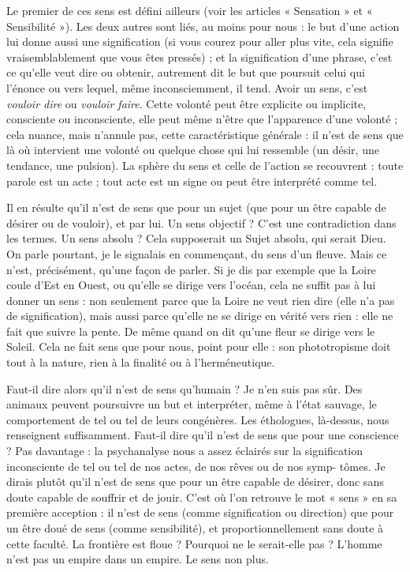 Le premier de ces sens est défini ailleurs (voir les articles « Sensation » et
« Sensibilité »). Les deux autres sont liés, au moins pour nous : le but d’une
action lui donne aussi une signification (si vous courez pour aller plus vite, cela
signifie vraisemblablement que vous êtes pressés) ; et la signification d’une
phrase, c’est ce qu’elle veut dire ou obtenir, autrement dit le but que poursuit
celui qui l’énonce ou vers lequel, même inconsciemment, il tend. Avoir un
sens, c'est {\it vouloir dire} ou {\it vouloir faire}. Cette volonté peut être explicite ou
implicite, consciente ou inconsciente, elle peut même n’être que l’apparence
d’une volonté ; cela nuance, mais n’annule pas, cette caractéristique générale :
il n’est de sens que là où intervient une volonté ou quelque chose qui lui ressemble
(un désir, une tendance, une pulsion). La sphère du sens et celle de
l’action se recouvrent : toute parole est un acte ; tout acte est un signe ou peut
être interprété comme tel.

Il en résulte qu’il n’est de sens que pour un sujet (que pour un être capable
de désirer ou de vouloir), et par lui. Un sens objectif ? C’est une contradiction
dans les termes. Un sens absolu ? Cela supposerait un Sujet absolu, qui serait
Dieu. On parle pourtant, je le signalais en commençant, du sens d’un fleuve.
Mais ce n’est, précisément, qu’une façon de parler. Si je dis par exemple que la
Loire coule d’Est en Ouest, ou qu’elle se dirige vers l’océan, cela ne suffit pas à
lui donner un sens : non seulement parce que la Loire ne veut rien dire (elle n’a
pas de signification), mais aussi parce qu’elle ne se dirige en vérité vers rien :
elle ne fait que suivre la pente. De même quand on dit qu’une fleur se dirige
vers le Soleil. Cela ne fait sens que pour nous, point pour elle : son phototropisme
doit tout à la nature, rien à la finalité ou à l’herméneutique.

Faut-il dire alors qu’il n’est de sens qu’humain ? Je n’en suis pas sûr. Des
animaux peuvent poursuivre un but et interpréter, même à l’état sauvage, le
comportement de tel ou tel de leurs congénères. Les éthologues, là-dessus, nous
renseignent suffisamment. Faut-il dire qu’il n’est de sens que pour une
conscience ? Pas davantage : la psychanalyse nous a assez éclairés sur la signification
inconsciente de tel ou tel de nos actes, de nos rêves ou de nos symp-
tômes. Je dirais plutôt qu’il n’est de sens que pour un être capable de désirer,
donc sans doute capable de souffrir et de jouir. C’est où l’on retrouve le mot
« sens » en sa première acception : il n’est de sens (comme signification ou
direction) que pour un être doué de sens (comme sensibilité), et proportionnellement
sans doute à cette faculté. La frontière est floue ? Pourquoi ne le serait-elle
pas ? L'homme n’est pas un empire dans un empire. Le sens non plus.

